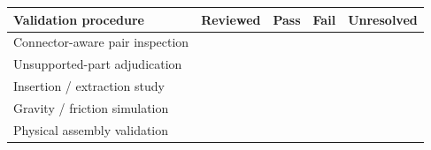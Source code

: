 \begin{tabularx}{\linewidth}{Xrrrr}
\toprule
Validation procedure & Reviewed & Pass & Fail & Unresolved\\\midrule
Connector-aware pair inspection &  &  &  & \\
Unsupported-part adjudication &  &  &  & \\
Insertion / extraction study &  &  &  & \\
Gravity / friction simulation &  &  &  & \\
Physical assembly validation &  &  &  & \\
\bottomrule
\end{tabularx}
